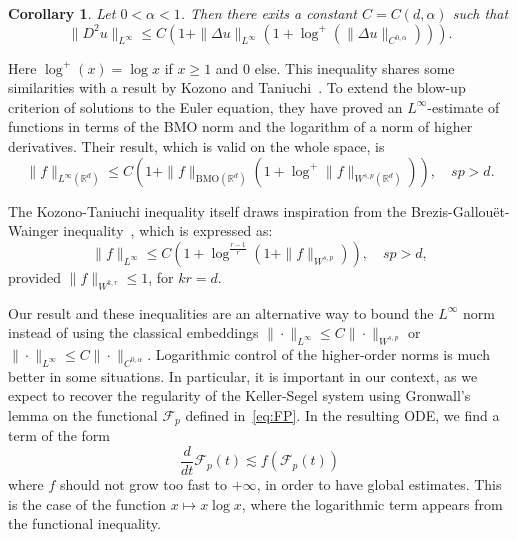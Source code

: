 \documentclass[a4paper,twosided, 11pt]{article}
\newcommand{\R}{\mathbb{R}}
\newcommand {\f}   {\frac}
\theoremstyle{plain}
\newtheorem{corollary}[thm]{Corollary}
\theoremstyle{remark}
\numberwithin{equation}{section}
\begin{document}
\begin{corollary}\label{cor:functional_inequality}
 Let $0<\alpha<1$. Then there exits a constant $C= C(d,\alpha)$  such that
$$
 \|D^{2}u\|_{L^{\infty}} \leq C(1+ \|\Delta u \|_{L^{\infty}} (1+\log^{+}\left(\|\Delta u\|_{C^{0,\alpha}}\right))).
$$
\end{corollary}

Here $\log^{+}(x)=\log x$ if $x\ge 1$ and 0 else. This inequality shares some similarities with a result by Kozono and Taniuchi~\cite{kozono2000limiting}. To extend the blow-up criterion of solutions to the Euler equation, they have proved an $L^{\infty}$-estimate of functions in terms of the
BMO norm and the logarithm of a norm of higher derivatives. Their result, which is valid on the whole space, is
\begin{equation}
    \|f\|_{L^{\infty}(\R^d)} \leq C\left(1 + \|f\|_{\text{BMO}(\R^d)}\left(1 + \log^{+}\|f\|_{W^{s,p}(\R^d)}\right)\right), \quad sp > d.
\end{equation}

The Kozono-Taniuchi inequality itself draws inspiration from the Brezis-Gallouët-Wainger inequality~\cite{brezis1979nonlinear,brezis1980note}, which is expressed as:
\begin{equation}
    \|f\|_{L^{\infty}} \leq C\left(1 + \log^{\frac{r-1}{r}}\left(1 + \|f\|_{W^{s,p}}\right)\right), \quad sp > d,
\end{equation}
provided $\|f\|_{W^{k,r}}\le 1$, for $kr=d.$

Our result and these inequalities are an alternative way to bound the $L^{\infty}$ norm instead of using the classical embeddings $\|\cdot\|_{L^{\infty}}\le C\|\cdot\|_{W^{s,p}}$ or $\|\cdot\|_{L^{\infty}}\le C\|\cdot\|_{C^{0,\alpha}}$. Logarithmic control of the higher-order norms is much better in some situations. In particular, it is important in our context, as we expect to recover the regularity of the Keller-Segel system using Gronwall's lemma on the functional $\mathcal{F}_{p}$ defined in~\eqref{eq:FP}. In the resulting ODE, we find a term of the form 
$$
\f{d}{dt}\mathcal{F}_{p}(t)\lesssim f( \mathcal{F}_{p}(t))
$$
where $f$ should not grow too fast to $+\infty$, in order to have global estimates. This is the case of the function $x\mapsto x\log x$, where the logarithmic term appears from the functional inequality. 
\end{document}
